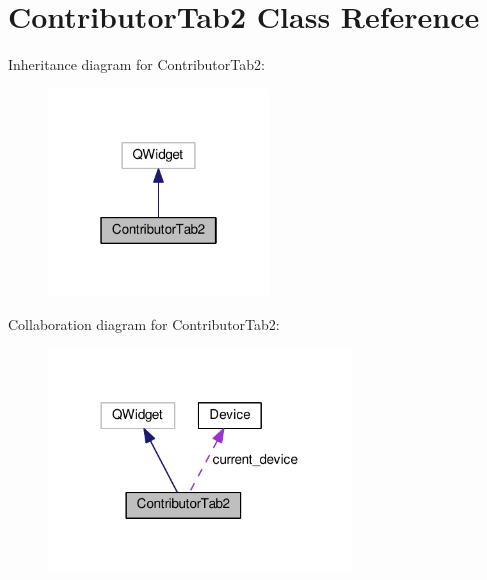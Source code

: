 \hypertarget{classContributorTab2}{}\section{Contributor\+Tab2 Class Reference}
\label{classContributorTab2}


Inheritance diagram for Contributor\+Tab2\+:\nopagebreak
\begin{figure}[H]
\begin{center}
\leavevmode
\includegraphics[width=166pt]{classContributorTab2__inherit__graph}
\end{center}
\end{figure}


Collaboration diagram for Contributor\+Tab2\+:\nopagebreak
\begin{figure}[H]
\begin{center}
\leavevmode
\includegraphics[width=228pt]{classContributorTab2__coll__graph}
\end{center}
\end{figure}
